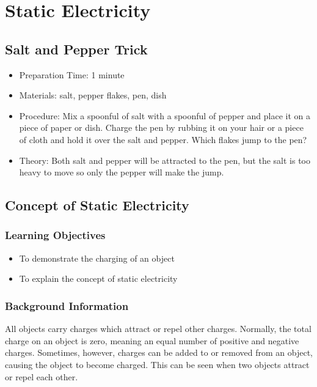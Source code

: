 \section{Static Electricity}


\subsection{Salt and Pepper Trick}
\begin{itemize}
\item{Preparation Time: 1 minute}
\item{Materials: salt, pepper flakes, pen, dish}
\item{Procedure: Mix a spoonful of salt with a spoonful of pepper and place it on a piece of paper or dish. Charge the pen by rubbing it on your hair or a piece of cloth and hold it over the salt and pepper. Which flakes jump to the pen?}
\item{Theory: Both salt and pepper will be attracted to the pen, but the salt is too heavy to move so only the pepper will make the jump.}
\end{itemize}


\subsection{Concept of Static Electricity}

\subsubsection*{Learning Objectives}
\begin{itemize}
\item{To demonstrate the charging of an object} 
\item{To explain the concept of static electricity} 
\end{itemize}

\subsubsection*{Background Information}
All objects carry charges which attract or repel other charges. Normally, the total charge on an object is zero, meaning an equal number of positive and negative charges. Sometimes, however, charges can be added to or removed from an object, causing the object to become charged. This can be seen when two objects attract or repel each other. 

